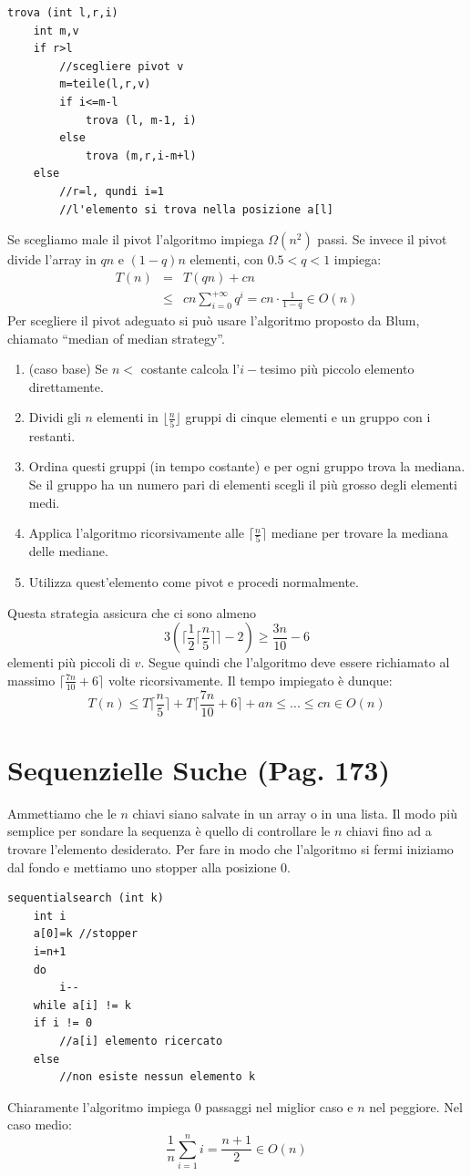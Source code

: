 \documentclass[a4paper]{book}
\newcommand{\lstIndent}{4}
\begin{document}
\begin{lstlisting}[tabsize=\lstIndent]
trova (int l,r,i)
	int m,v
	if r>l
		//scegliere pivot v
		m=teile(l,r,v)
		if i<=m-l
			trova (l, m-1, i)
		else
			trova (m,r,i-m+l)
	else
		//r=l, qundi i=1
		//l'elemento si trova nella posizione a[l]	 			
\end{lstlisting}
Se scegliamo male il pivot l'algoritmo impiega $\Omega (n^2)$ passi. Se invece il pivot divide l'array in $qn$ e $(1-q)n$ elementi, con $0.5<q<1$ impiega:
\begin{eqnarray}
T(n) &=& T(qn)+cn \nonumber \\
& \leq & cn \sum_{i=0}^{+\infty} q^i = cn \cdot\frac{1}{1-q} \in O(n)
\end{eqnarray}
Per scegliere il pivot adeguato si può usare l'algoritmo proposto da Blum, chiamato ``median of median strategy''.
\begin{enumerate}
\item (caso base) Se $n<$ costante calcola l'$i-$tesimo più piccolo elemento direttamente.
\item Dividi gli $n$ elementi in $\lfloor \frac{n}{5} \rfloor$ gruppi di cinque elementi e un gruppo con i restanti. 
\item Ordina questi gruppi (in tempo costante) e per ogni gruppo trova la mediana. Se il gruppo ha un numero pari di elementi scegli il più grosso degli elementi medi. 
\item Applica l'algoritmo ricorsivamente alle $\lceil \frac{n}{5} \rceil$ mediane per trovare la mediana delle mediane.
\item Utilizza quest'elemento come pivot e procedi normalmente.
\end{enumerate}
Questa strategia assicura che ci sono almeno 
$$ 3\left(\lceil \frac{1}{2} \lceil \frac{n}{5} \rceil \rceil -2\right) \geq \frac{3n}{10} -6$$
elementi più piccoli di $v$. Segue quindi che l'algoritmo deve essere richiamato al massimo $ \lceil \frac{7n}{10} + 6 \rceil$ volte ricorsivamente. Il tempo impiegato è dunque:
$$ T(n) \leq T\lceil \frac{n}{5} \rceil +T \lceil \frac{7n}{10} +6 \rceil + an \leq ... \leq cn \in O(n) $$
\section{Sequenzielle Suche (Pag. 173)}
Ammettiamo che le $n$ chiavi siano salvate in un array o in una lista. Il modo più semplice per sondare la sequenza è quello di controllare le $n$ chiavi fino ad a trovare l'elemento desiderato. Per fare in modo che l'algoritmo si fermi iniziamo dal fondo e mettiamo uno stopper alla posizione 0.
\begin{lstlisting}[tabsize=\lstIndent]
sequentialsearch (int k)
	int i
	a[0]=k //stopper
	i=n+1
	do
		i--
	while a[i] != k
	if i != 0
		//a[i] elemento ricercato
	else
		//non esiste nessun elemento k		
\end{lstlisting} 
Chiaramente l'algoritmo impiega 0 passaggi nel miglior caso e $n$ nel peggiore. Nel caso medio:
$$ \frac{1}{n} \sum_{i=1}^n i = \frac{n+1}{2} \in O(n) $$
\end{document}
